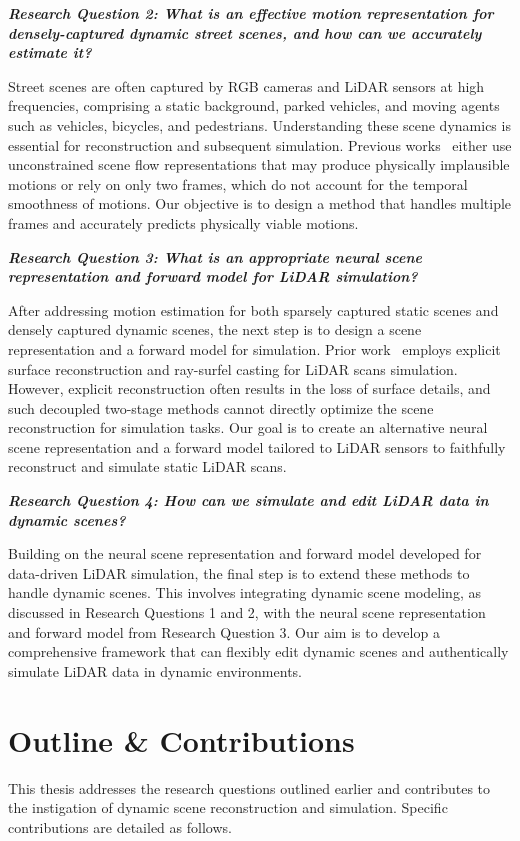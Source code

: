 \noindent
\textbf{\textit{Research Question 2: What is an effective motion representation for densely-captured dynamic street scenes, and how can we accurately estimate it?}}

Street scenes are often captured by RGB cameras and LiDAR sensors at high frequencies, comprising a static background, parked vehicles, and moving agents such as vehicles, bicycles, and pedestrians. Understanding these scene dynamics is essential for reconstruction and subsequent simulation. Previous works~\cite{li2020neural,gojcic2021weakly} either use unconstrained scene flow representations that may produce physically implausible motions or rely on only two frames, which do not account for the temporal smoothness of motions. Our objective is to design a method that handles multiple frames and accurately predicts physically viable motions.

\noindent
\textbf{\textit{Research Question 3: What is an appropriate neural scene representation and forward model for LiDAR simulation?}}

After addressing motion estimation for both sparsely captured static scenes and densely captured dynamic scenes, the next step is to design a scene representation and a forward model for simulation. Prior work~\cite{manivasagam2020lidarsim} employs explicit surface reconstruction and ray-surfel casting for LiDAR scans simulation. However, explicit reconstruction often results in the loss of surface details, and such decoupled two-stage methods cannot directly optimize the scene reconstruction for simulation tasks. Our goal is to create an alternative neural scene representation and a forward model tailored to LiDAR sensors to faithfully reconstruct and simulate static LiDAR scans.

\noindent
\textbf{\textit{Research Question 4: How can we simulate and edit LiDAR data in dynamic scenes?}}

Building on the neural scene representation and forward model developed for data-driven LiDAR simulation, the final step is to extend these methods to handle dynamic scenes. This involves integrating dynamic scene modeling, as discussed in Research Questions 1 and 2, with the neural scene representation and forward model from Research Question 3. Our aim is to develop a comprehensive framework that can flexibly edit dynamic scenes and authentically simulate LiDAR data in dynamic environments.

\section{Outline \& Contributions} 
This thesis addresses the research questions outlined earlier and contributes to the instigation of dynamic scene reconstruction and simulation. Speciﬁc contributions are detailed as follows.



